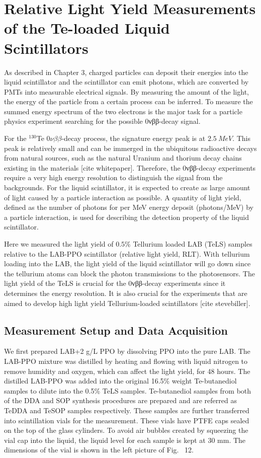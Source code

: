 \section{Relative Light Yield Measurements of the Te-loaded Liquid Scintillators}

As described in Chapter 3, charged particles can deposit their energies into the liquid scintillator and the scintillator can emit photons, which are converted by PMTs into measurable electrical signals. By measuring the amount of the light, the energy of the particle from a certain process can be inferred. To measure the summed energy spectrum of the two electrons is the major task for a particle physics experiment searching for the possible 0νββ-decay signal.

For the $^{130}${Te} $0\nu\beta\beta$-decay process, the signature energy peak is at $2.5~MeV$\cite{whitepaper}.  This peak is relatively small and can be immerged in the ubiquitous radioactive decays from natural sources, such as the natural Uranium and thorium decay chains existing in the materials [cite whitepaper]. Therefore, the 0νββ-decay experiments require a very high energy resolution to distinguish the signal from the backgrounds. For the liquid scintillator, it is expected to create as large amount of light caused by a particle interaction as possible. A quantity of light yield, defined as the number of photons for per MeV energy deposit (photons/MeV) by a particle interaction, is used for describing the detection property of the liquid scintillator.

Here we measured the light yield of $0.5\%$ Tellurium loaded LAB (TeLS) samples relative to the LAB-PPO scintillator (relative light yield, RLT). With tellurium loading into the LAB, the light yield of the liquid scintillator will go down since the tellurium atoms can block the photon transmissions to the photosensors.  The light yield of the TeLS is crucial for the 0νββ-decay experiments since it determines the energy resolution. It is also crucial for the experiments that are aimed to develop high light yield Tellurium-loaded scintillators [cite stevebiller].

\subsection{Measurement Setup and Data Acquisition}

We first prepared LAB+2 g/L PPO by dissolving PPO into the pure LAB. The LAB-PPO mixture was distilled by heating and flowing with liquid nitrogen to remove humidity and oxygen, which can affect the light yield, for 48 hours. The distilled LAB-PPO was added into the original 16.5\% weight Te-butanediol samples to dilute into the 0.5\% TeLS samples.  Te-butanediol samples from both of the DDA and SOP synthesis procedures are prepared and are referred as TeDDA and TeSOP samples respectively. These samples are further transferred into scintillation vials for the measurement. These vials have PTFE caps sealed on the top of the glass cylinders. To avoid air bubbles created by squeezing the vial cap into the liquid, the liquid level for each sample is kept at 30 mm. The dimensions of the vial is shown in the left picture of Fig.~ 12.

